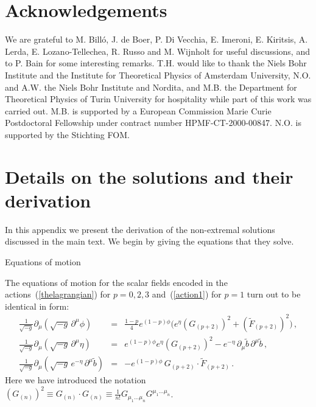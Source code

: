 \documentclass[a4paper,11pt]{article}
\makeatletter
\renewcommand{\subsection}{\@startsection{subsection}{2}{\z@} {-3.25ex
plus -1ex minus -.2ex}{1.5ex plus .2ex}{\normalsize\bf}}
\newcommand{\eqref}[1]{(\ref{#1})}
\makeatother
\begin{document}
\vspace{1ex}
\section*{Acknowledgements}

We are grateful to M. Bill\'o, J. de Boer, P. Di Vecchia, E. Imeroni,
E. Kiritsis, A. Lerda, E. Lozano-Tellechea, R. Russo and M. Wijnholt
for useful discussions, and to P. Bain for some interesting remarks.
T.H. would like to thank the Niels Bohr Institute and the Institute
for Theoretical Physics of Amsterdam University, N.O. and A.W. the
Niels Bohr Institute and Nordita, and M.B. the Department for Theoretical
Physics of Turin University for hospitality while part of this work was
carried out. M.B. is supported by a European Commission Marie Curie
Postdoctoral Fellowship under contract number HPMF-CT-2000-00847.
N.O. is supported by the Stichting FOM.

\vspace{1ex} \appendix

\section{Details on the solutions and their derivation}
\label{sec:theapp}

In this appendix we present the derivation of the non-extremal solutions
discussed in the main text. We begin by giving the equations that they solve.

\subsection{Equations of motion}
\label{subsect:EOMs}

The equations of motion for the scalar fields encoded in the
actions~\eqref{thelagrangian} for $p=0,2,3$ and~\eqref{action1} for
$p=1$ turn out to be identical in form:
%
\begin{eqnarray}
\label{phieom}
\frac{1}{\sqrt{-g}} \partial_\mu ( \sqrt{-g}\,\partial^\mu\!\phi ) &=&
\frac{1-p}{4} e^{(1-p)\phi}\Big( e^\eta (G_{(p+2)})^2 +
(\tilde{F}_{(p+2)})^2 \Big) \,, \\
%
\label{etaeom}
\frac{1}{\sqrt{-g}} \partial_\mu ( \sqrt{-g}\,\partial^\mu\eta ) &=&
e^{(1-p)\phi} e^\eta (G_{(p+2)})^2 - e^{-\eta} \,
\partial_\mu\tilde{b}\,\partial^\mu\tilde{b} \,,\\
%
\label{beom}
\frac{1}{\sqrt{-g}}
 \partial_\mu(\sqrt{-g}\,e^{-\eta}\,\partial^\mu\tilde{b})  &=& -
 e^{(1-p)\phi} \,G_{(p+2)}\cdot \tilde{F}_{(p+2)} \,.
\end{eqnarray}
%
Here we have introduced the notation  $(G_{(n)})^2 \equiv G_{(n)}\cdot
G_{(n)}\equiv \frac{1}{n!} G_{\mu_1  \ldots \mu_{n}} G^{\mu_1 \ldots
\mu_{n}}$.
\end{document}
